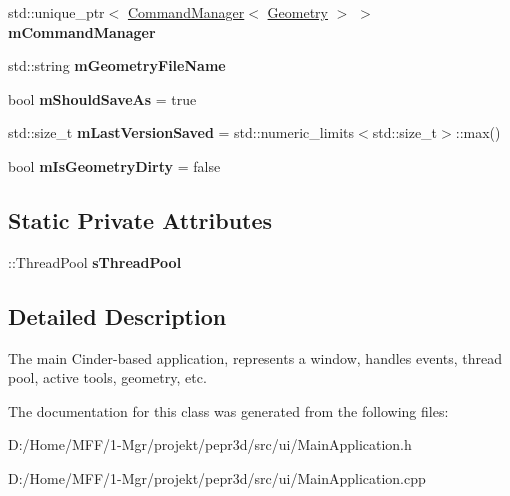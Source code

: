 \begin{DoxyCompactItemize}
std\+::unique\+\_\+ptr$<$ \mbox{\hyperlink{classpepr3d_1_1_command_manager}{Command\+Manager}}$<$ \mbox{\hyperlink{classpepr3d_1_1_geometry}{Geometry}} $>$ $>$ {\bfseries m\+Command\+Manager}
\item 
\mbox{\label{classpepr3d_1_1_main_application_a86fa5e0f7cd52754e0b2d1cf0a15db35}} 
std\+::string {\bfseries m\+Geometry\+File\+Name}
\item 
\mbox{\label{classpepr3d_1_1_main_application_ac7cd61ba12de9b969d87c63388fb2c2a}} 
bool {\bfseries m\+Should\+Save\+As} = true
\item 
\mbox{\label{classpepr3d_1_1_main_application_aa071bb750bf3e9208764d64f6ab3cfed}} 
std\+::size\+\_\+t {\bfseries m\+Last\+Version\+Saved} = std\+::numeric\+\_\+limits$<$std\+::size\+\_\+t$>$\+::max()
\item 
\mbox{\label{classpepr3d_1_1_main_application_a2b9d7b9f1eda86cbaf509fd2be5bc5ab}} 
bool {\bfseries m\+Is\+Geometry\+Dirty} = false
\end{DoxyCompactItemize}
\subsection*{Static Private Attributes}
\begin{DoxyCompactItemize}
\item 
\mbox{\label{classpepr3d_1_1_main_application_a1171d4775a0e1cf5d00dd4995eff2262}} 
\+::Thread\+Pool {\bfseries s\+Thread\+Pool}
\end{DoxyCompactItemize}


\subsection{Detailed Description}
The main Cinder-\/based application, represents a window, handles events, thread pool, active tools, geometry, etc. 

The documentation for this class was generated from the following files\+:\begin{DoxyCompactItemize}
\item 
D\+:/\+Home/\+M\+F\+F/1-\/\+Mgr/projekt/pepr3d/src/ui/Main\+Application.\+h\item 
D\+:/\+Home/\+M\+F\+F/1-\/\+Mgr/projekt/pepr3d/src/ui/Main\+Application.\+cpp\end{DoxyCompactItemize}
